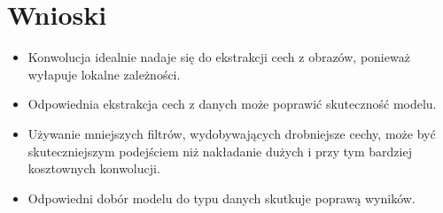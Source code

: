 \documentclass{article}
\begin{document}
\newpage
\section{Wnioski}

\begin{itemize}
	\item Konwolucja idealnie nadaje się do ekstrakcji cech z obrazów, ponieważ wyłapuje lokalne zależności.
	\item Odpowiednia ekstrakcja cech z danych może poprawić skuteczność modelu.
	\item Używanie mniejszych filtrów, wydobywających drobniejsze cechy, może być skuteczniejszym podejściem niż nakładanie dużych i przy tym bardziej kosztownych konwolucji.
	\item Odpowiedni dobór modelu do typu danych skutkuje poprawą wyników.
\end{itemize}
\end{document}
